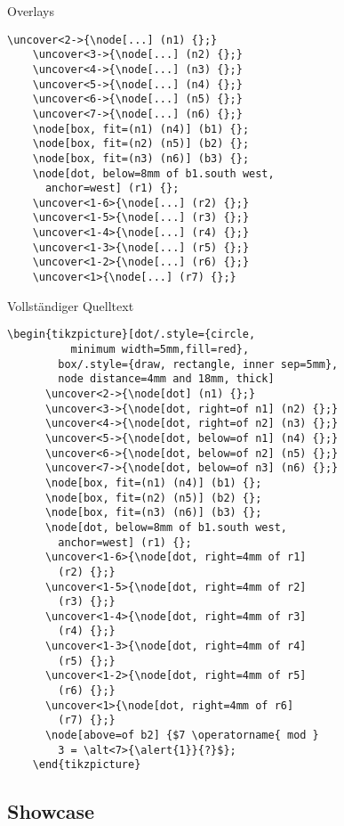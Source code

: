 \begin{Frame}[fragile]{Overlays}
  \begin{lstlisting}[gobble=4]
    \uncover<2->{\node[...] (n1) {};}
    \uncover<3->{\node[...] (n2) {};}
    \uncover<4->{\node[...] (n3) {};}
    \uncover<5->{\node[...] (n4) {};}
    \uncover<6->{\node[...] (n5) {};}
    \uncover<7->{\node[...] (n6) {};}
    \node[box, fit=(n1) (n4)] (b1) {};
    \node[box, fit=(n2) (n5)] (b2) {};
    \node[box, fit=(n3) (n6)] (b3) {};
    \node[dot, below=8mm of b1.south west,
      anchor=west] (r1) {};
    \uncover<1-6>{\node[...] (r2) {};}
    \uncover<1-5>{\node[...] (r3) {};}
    \uncover<1-4>{\node[...] (r4) {};}
    \uncover<1-3>{\node[...] (r5) {};}
    \uncover<1-2>{\node[...] (r6) {};}
    \uncover<1>{\node[...] (r7) {};}
  \end{lstlisting}
\end{Frame}

\begin{Frame}{Vollständiger Quelltext}
  \begin{lstlisting}[gobble=4]
    \begin{tikzpicture}[dot/.style={circle,
          minimum width=5mm,fill=red},
        box/.style={draw, rectangle, inner sep=5mm},
        node distance=4mm and 18mm, thick]
      \uncover<2->{\node[dot] (n1) {};}
      \uncover<3->{\node[dot, right=of n1] (n2) {};}
      \uncover<4->{\node[dot, right=of n2] (n3) {};}
      \uncover<5->{\node[dot, below=of n1] (n4) {};}
      \uncover<6->{\node[dot, below=of n2] (n5) {};}
      \uncover<7->{\node[dot, below=of n3] (n6) {};}
      \node[box, fit=(n1) (n4)] (b1) {};
      \node[box, fit=(n2) (n5)] (b2) {};
      \node[box, fit=(n3) (n6)] (b3) {};
      \node[dot, below=8mm of b1.south west,
        anchor=west] (r1) {};
      \uncover<1-6>{\node[dot, right=4mm of r1]
        (r2) {};}
      \uncover<1-5>{\node[dot, right=4mm of r2]
        (r3) {};}
      \uncover<1-4>{\node[dot, right=4mm of r3]
        (r4) {};}
      \uncover<1-3>{\node[dot, right=4mm of r4]
        (r5) {};}
      \uncover<1-2>{\node[dot, right=4mm of r5]
        (r6) {};}
      \uncover<1>{\node[dot, right=4mm of r6]
        (r7) {};}
      \node[above=of b2] {$7 \operatorname{ mod }
        3 = \alt<7>{\alert{1}}{?}$};
    \end{tikzpicture}
  \end{lstlisting}
\end{Frame}

\subsection{Showcase}

